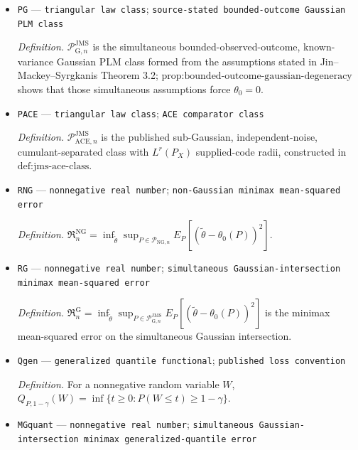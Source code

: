 \documentclass{article}
\begin{document}
\begin{itemize}
  \par\smallskip\noindent\emph{Definition.} \(\mathcal P_{\mathrm{NG},n}\) is the broad fixed-separation spectral class constructed in \(\text{def:non-gaussian-class}\) using only \(\bar g_n\) and \(\varepsilon_{1,n}\) among supplied-code inputs.
  \item \texttt{PG} --- \texttt{triangular law class}; \texttt{source-\allowbreak{}stated bounded-\allowbreak{}outcome Gaussian PLM class}
  \par\smallskip\noindent\emph{Definition.} \(\mathcal P_{\mathrm G,n}^{\mathrm{JMS}}\) is the simultaneous bounded-observed-outcome, known-variance Gaussian PLM class formed from the assumptions stated in Jin--Mackey--Syrgkanis Theorem 3.2; \(\text{prop:bounded-outcome-gaussian-degeneracy}\) shows that those simultaneous assumptions force \(\theta_0=0\).
  \item \texttt{PACE} --- \texttt{triangular law class}; \texttt{ACE comparator class}
  \par\smallskip\noindent\emph{Definition.} \(\mathcal P_{\mathrm{ACE},n}^{\mathrm{JMS}}\) is the published sub-Gaussian, independent-noise, cumulant-separated class with \(L^r(P_X)\) supplied-code radii, constructed in \(\text{def:jms-ace-class}\).
  \item \texttt{RNG} --- \texttt{nonnegative real number}; \texttt{non-\allowbreak{}Gaussian minimax mean-\allowbreak{}squared error}
  \par\smallskip\noindent\emph{Definition.} \(\mathfrak R_{n}^{\mathrm{NG}}=\inf_{\widetilde\theta}\sup_{P\in\mathcal P_{\mathrm{NG},n}}E_P[(\widetilde\theta-\theta_0(P))^2]\).
  \item \texttt{RG} --- \texttt{nonnegative real number}; \texttt{simultaneous Gaussian-\allowbreak{}intersection minimax mean-\allowbreak{}squared error}
  \par\smallskip\noindent\emph{Definition.} \(\mathfrak R_{n}^{\mathrm G}=\inf_{\widetilde\theta}\sup_{P\in\mathcal P_{\mathrm G,n}^{\mathrm{JMS}}}E_P[(\widetilde\theta-\theta_0(P))^2]\) is the minimax mean-squared error on the simultaneous Gaussian intersection.
  \item \texttt{Qgen} --- \texttt{generalized quantile functional}; \texttt{published loss convention}
  \par\smallskip\noindent\emph{Definition.} For a nonnegative random variable \(W\), \(Q_{P,1-\gamma}(W)=\inf\{t\ge0:P(W\le t)\ge1-\gamma\}\).
  \item \texttt{MGquant} --- \texttt{nonnegative real number}; \texttt{simultaneous Gaussian-\allowbreak{}intersection minimax generalized-\allowbreak{}quantile error}

\end{itemize}
\end{document}
